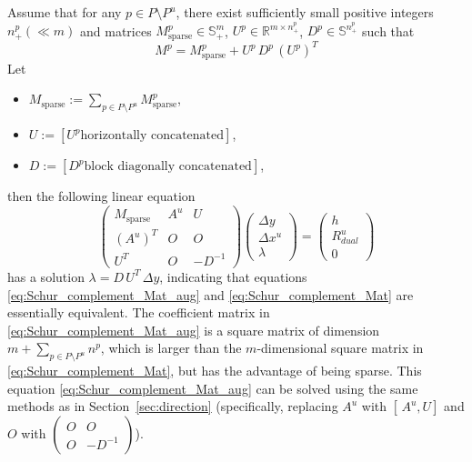 Assume that for any $p\in P\setminus P^u$, there exist sufficiently small positive integers $n^p_+(\ll m)$ and matrices $M^p_{\mathrm{sparse}} \in \mathbb{S}^m_+$, $U^p \in \mathbb{R}^{m\times n^p_+}$, $D^p\in \mathbb{S}^{n^p_+}$ such that
\begin{equation}
  M^p = M^p_{\mathrm{sparse}} + U^p\, D^p\, (U^p)^T
  \label{eq:low_rank_perturbation}
\end{equation}
Let 
\begin{itemize}
\item $M_{\mathrm{sparse}} := \sum_{p\in P\setminus P^u} M^p_{\mathrm{sparse}}$,
\item $U := [U^p \text{horizontally concatenated}]$, 
\item $D:=[D^p\text{block diagonally concatenated}]$,
\end{itemize}
then the following linear equation
\begin{equation}
  \begin{pmatrix}
    M_{\mathrm{sparse}} & A^u & U \\
    (A^u)^T & O & O \\
    U^T & O & -D^{-1}
  \end{pmatrix}
  \begin{pmatrix}
    \Delta y \\
    \Delta x^u \\
    \lambda
  \end{pmatrix}
  =
  \begin{pmatrix}
    h \\
    R^u_{dual} \\
    0
  \end{pmatrix}
  \label{eq:Schur_complement_Mat_aug}
\end{equation}
has a solution $\lambda = D\,U^T\,\Delta y$, indicating that equations \eqref{eq:Schur_complement_Mat_aug} and \eqref{eq:Schur_complement_Mat} are essentially equivalent.
The coefficient matrix in \eqref{eq:Schur_complement_Mat_aug} is a square matrix of dimension $m+\sum_{p\in P\setminus P^u} n^p$, which is larger than the $m$-dimensional square matrix in \eqref{eq:Schur_complement_Mat}, but has the advantage of being sparse.
This equation \eqref{eq:Schur_complement_Mat_aug} can be solved using the same methods as in Section~\ref{sec:direction}
(specifically, replacing $A^u$ with $[\,A^u, U]$ and $O$ with $\begin{pmatrix} O & O \\ O & -D^{-1} \end{pmatrix}$).

